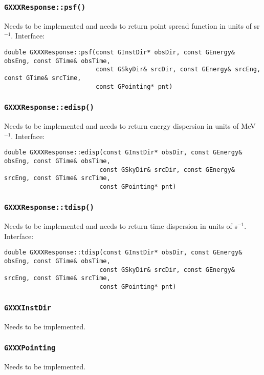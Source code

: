 \documentclass{article}[12pt,a4]
\begin{document}
\subsubsection{{\tt GXXXResponse::psf()}}

Needs to be implemented and needs to return point spread function in units of sr$^{-1}$.
Interface:
\begin{verbatim}
double GXXXResponse::psf(const GInstDir* obsDir, const GEnergy& obsEng, const GTime& obsTime,
                         const GSkyDir& srcDir, const GEnergy& srcEng, const GTime& srcTime,
                         const GPointing* pnt)
\end{verbatim}


\subsubsection{{\tt GXXXResponse::edisp()}}

Needs to be implemented and needs to return energy dispersion in units of MeV$^{-1}$.
Interface:
\begin{verbatim}
double GXXXResponse::edisp(const GInstDir* obsDir, const GEnergy& obsEng, const GTime& obsTime,
                          const GSkyDir& srcDir, const GEnergy& srcEng, const GTime& srcTime,
                          const GPointing* pnt)
\end{verbatim}


\subsubsection{{\tt GXXXResponse::tdisp()}}

Needs to be implemented and needs to return time dispersion in units of s$^{-1}$.
Interface:
\begin{verbatim}
double GXXXResponse::tdisp(const GInstDir* obsDir, const GEnergy& obsEng, const GTime& obsTime,
                          const GSkyDir& srcDir, const GEnergy& srcEng, const GTime& srcTime,
                          const GPointing* pnt)
\end{verbatim}


\subsubsection{{\tt GXXXInstDir}}

Needs to be implemented.


\subsubsection{{\tt GXXXPointing}}

Needs to be implemented.
\end{document}
